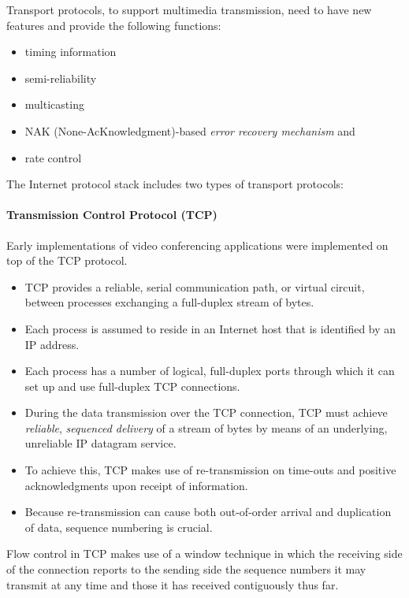 Transport protocols, to support multimedia transmission, need to have new features and provide the following functions: 
\begin{multicols}{2}
	\begin{itemize}
		\item timing information 
		\item semi-reliability 
		\item multicasting 
		\item NAK (None-AcKnowledgment)-based \textit{error recovery mechanism} and 
		\item rate control
	\end{itemize}
\end{multicols}


The Internet protocol stack includes two types of transport protocols:

\paragraph{Transmission Control Protocol (TCP)}
	
Early implementations of video conferencing applications were implemented on top of	the TCP protocol. 
\begin{itemize}
	\item TCP provides a reliable, serial communication path, or virtual circuit, between processes exchanging a full-duplex stream of bytes.
	\item Each process is assumed to reside in an Internet host that is identified by an IP address. 
	\item Each process has a number of logical, full-duplex ports through which it can set up and use full-duplex TCP connections.
	\item During the data transmission over the TCP connection, TCP must achieve \textit{reliable}, \textit{sequenced delivery} of a stream of bytes by means of an underlying, unreliable IP datagram service. 
	\item To achieve this, TCP makes use of re-transmission on time-outs and positive acknowledgments upon receipt of information.
	\item Because re-transmission can cause both out-of-order arrival and duplication of data, sequence numbering is crucial.
\end{itemize}

Flow control in TCP makes use of a window technique in which the receiving side of the connection reports to the sending side the sequence numbers it may transmit at any	time and those it has received contiguously thus far.
	

